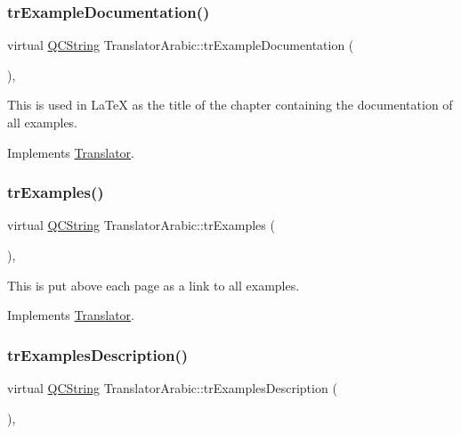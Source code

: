 \subsubsection{\texorpdfstring{trExampleDocumentation()}{trExampleDocumentation()}}
{\footnotesize\ttfamily virtual \mbox{\hyperlink{class_q_c_string}{Q\+C\+String}} Translator\+Arabic\+::tr\+Example\+Documentation (\begin{DoxyParamCaption}{ }\end{DoxyParamCaption})\hspace{0.3cm}{\ttfamily [inline]}, {\ttfamily [virtual]}}

This is used in La\+TeX as the title of the chapter containing the documentation of all examples. 

Implements \mbox{\hyperlink{class_translator}{Translator}}.

\mbox{\label{class_translator_arabic_a25e1edc62b0483c21294f890cea8d0cb}} 
\subsubsection{\texorpdfstring{trExamples()}{trExamples()}}
{\footnotesize\ttfamily virtual \mbox{\hyperlink{class_q_c_string}{Q\+C\+String}} Translator\+Arabic\+::tr\+Examples (\begin{DoxyParamCaption}{ }\end{DoxyParamCaption})\hspace{0.3cm}{\ttfamily [inline]}, {\ttfamily [virtual]}}

This is put above each page as a link to all examples. 

Implements \mbox{\hyperlink{class_translator}{Translator}}.

\mbox{\label{class_translator_arabic_a9447a02d8ff3f92c9836c317d16e9c8c}} 
\subsubsection{\texorpdfstring{trExamplesDescription()}{trExamplesDescription()}}
{\footnotesize\ttfamily virtual \mbox{\hyperlink{class_q_c_string}{Q\+C\+String}} Translator\+Arabic\+::tr\+Examples\+Description (\begin{DoxyParamCaption}{ }\end{DoxyParamCaption})\hspace{0.3cm}{\ttfamily [inline]}, {\ttfamily [virtual]}}

